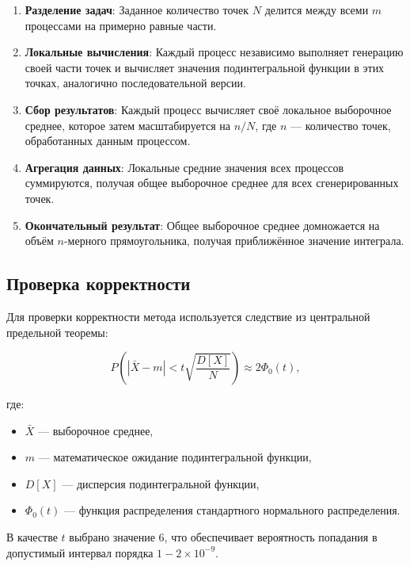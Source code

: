 \documentclass[a4paper,12pt]{article}
\begin{document}
\begin{enumerate}
    \item \textbf{Разделение задач}: Заданное количество точек $N$ делится между всеми $m$ процессами на примерно равные части.
    
    \item \textbf{Локальные вычисления}: Каждый процесс независимо выполняет генерацию своей части точек и вычисляет значения подинтегральной функции в этих точках, аналогично последовательной версии.
    
    \item \textbf{Сбор результатов}: Каждый процесс вычисляет своё локальное выборочное среднее, которое затем масштабируется на $n/N$, где $n$ — количество точек, обработанных данным процессом.
    
    \item \textbf{Агрегация данных}: Локальные средние значения всех процессов суммируются, получая общее выборочное среднее для всех сгенерированных точек.
    
    \item \textbf{Окончательный результат}: Общее выборочное среднее домножается на объём $n$-мерного прямоугольника, получая приближённое значение интеграла.
\end{enumerate}

\subsection{Проверка корректности}

Для проверки корректности метода используется следствие из центральной предельной теоремы:

$$
P \left( \left| \bar{X} - m \right| < t \sqrt{\frac{D[X]}{N}} \right) \approx 2\Phi_0(t),
$$

где:
\begin{itemize}
    \item $\bar{X}$ — выборочное среднее,
    \item $m$ — математическое ожидание подинтегральной функции,
    \item $D[X]$ — дисперсия подинтегральной функции,
    \item $\Phi_0(t)$ — функция распределения стандартного нормального распределения.
\end{itemize}

В качестве $t$ выбрано значение 6, что обеспечивает вероятность попадания в допустимый интервал порядка $1 - 2 \times 10^{-9}$.
\end{document}
